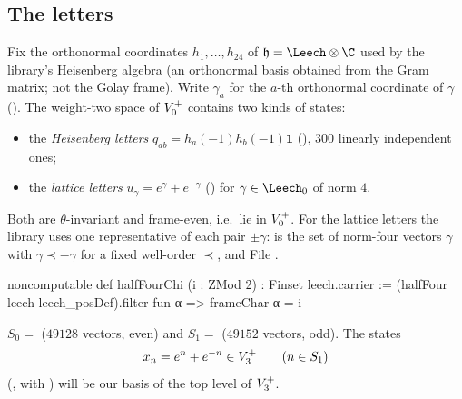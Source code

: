 \subsection{The letters}
Fix the orthonormal coordinates $h_1,\dots,h_{24}$ of $\mathfrak h=\Leech\otimes\C$ used by the
library's Heisenberg algebra (an orthonormal basis obtained from the Gram matrix; not the Golay frame).
Write $\gamma_a$ for the $a$-th orthonormal coordinate of $\gamma$ ().
The weight-two space of $V_0^{+}$ contains two kinds of states:
\begin{itemize}
\item the \emph{Heisenberg letters} $q_{ab}=h_a(-1)h_b(-1)\mathbf 1$ (), $300$ linearly
  independent ones;
\item the \emph{lattice letters} $u_\gamma=e^\gamma+e^{-\gamma}$ () for $\gamma\in\Leech_0$ of
  norm $4$.
\end{itemize}
Both are $\theta$-invariant and frame-even, i.e.\ lie in $V_0^{+}$. For the lattice letters the
library uses one representative of each pair $\pm\gamma$:  is the set of norm-four
vectors $\gamma$ with $\gamma\prec-\gamma$ for a fixed well-order $\prec$, and
\noindent File .
\begin{leancode}
noncomputable def halfFourChi (i : ZMod 2) : Finset leech.carrier :=
  (halfFour leech leech_posDef).filter fun α => frameChar α = i
\end{leancode}
$S_0=$ ($49128$ vectors, even) and $S_1=$ ($49152$ vectors, odd).
The states
\begin{equation*}
  x_n=e^{n}+e^{-n}\in V_3^{+}\qquad(n\in S_1)
\end{equation*}
(, with ) will be our
basis of the top level of $V_3^{+}$.

